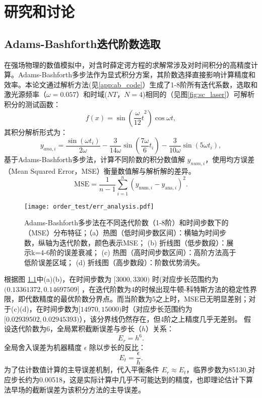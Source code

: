 \chapter{研究和讨论}
\section{Adams-Bashforth迭代阶数选取}
在强场物理的数值模拟中，对含时薛定谔方程的求解常涉及对时间积分的高精度计算。Adams-Bashforth多步法作为显式积分方案，其阶数选择直接影响计算精度和效率。本论文通过解析方法(见\ref{app:ab_code}）生成了1-8阶所有迭代系数，选取和激光源频率（$\omega = 0.057$）和时域($N T$，$N = 4$)相同的（见图\ref{fig:sc_laser}）可解析积分的测试函数：
\begin{equation}
	f(x) = \sin({\frac{\omega}{12} t}^2) \cos{\omega t},
\end{equation}
其积分解析形式为：
\begin{equation}
	y_{ana, i} = \frac{\sin{(\omega t_i)}}{2\omega} - \frac{3}{14\omega}\sin{(\frac{7\omega}{6} t_i)} - 
	\frac{3}{10\omega}\sin{(5\omega t_i)},
\end{equation}
基于​​Adams-Bashforth多步法​​，计算不同阶数的积分数值解 $y_{num, i}$，使用均方误差（​​Mean Squared Error​​，MSE）衡量数值解与解析解的差异。
\begin{equation}
	\text{MSE} = \frac{1}{n-1} \sum_{i=1}^n \left( y_{\text{num},i} - y_{\text{ana},i} \right)^2.
\end{equation}

\begin{figure}[!htbp]  %
	\centering
	\texttt{[image: order\_test/err\_analysis.pdf]}
	\caption{Adams-Bashforth多步法在不同迭代阶数（1-8阶）和时间步数下的（MSE）分布特征；（a）热图（低时间步数区间）：横轴为时间步数，纵轴为迭代阶数，颜色表示MSE；
		(b) 折线图（低步数段）：展示k=4-6阶的误差衰减；
		(c) 热图（高时间步数区间）：高阶方法高于低阶误差区域；
		(d) 折线图（高步数段）：阶数优势消失。}
	\label{fig:err_analysis}
\end{figure}

根据图 \ref{fig:err_analysis}中(a)(b)，在时间步数为 $[3000, 3300)$ 时(对应步长范围约为 $(0.13361372, 0.14697509]$ ，在迭代阶数为4的时候出现牛顿-科特斯方法的稳定性界限，即代数精度的最优阶数分界点。而当阶数为5之上时，MSE已无明显差别；对于(c)(d)，在时间步数为$[14970, 15000)$时（对应步长范围约为 $[0.02939502, 0.02945393)$），该分界线仍然存在，但4阶之上精度几乎无差别。
假设迭代阶数为6，全局累积截断误差与步长（$h$）关系：
\begin{equation}
	E_{r} = h^6.
\end{equation}
全局舍入误差为机器精度 $\epsilon$ 除以步长的反比：
\begin{equation}
	E_{t} = \frac{\epsilon}{h}.
\end{equation}
为了估计数值计算的主导误差机制，代入平衡条件 $E_{r}\approx E_{t}$，临界步数为85130,对应步长约为0.00518，这是实际计算中几乎不可能达到的精度，也即理论估计下算法早场的截断误差为该积分方法的主导误差。

